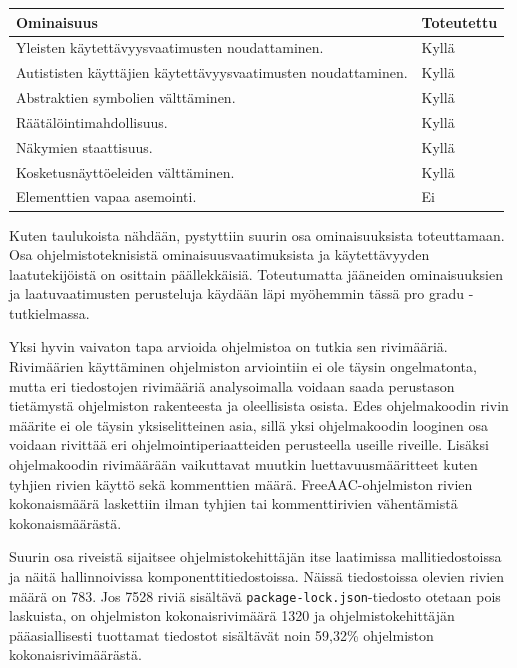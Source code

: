 \documentclass[utf8]{gradu3}
\begin{document}
\begin{center}
    \begin{tabular}{ | l | l |}
    \hline
    \textbf{Ominaisuus} & \textbf{Toteutettu} \\ \hline
    Yleisten käytettävyysvaatimusten noudattaminen. & Kyllä \\ \hline
    Autististen käyttäjien käytettävyysvaatimusten noudattaminen. & Kyllä \\ \hline
    Abstraktien symbolien välttäminen. & Kyllä \\ \hline
    Räätälöintimahdollisuus. & Kyllä \\ \hline
    Näkymien staattisuus. & Kyllä \\ \hline
    Kosketusnäyttöeleiden välttäminen. & Kyllä \\ \hline
    Elementtien vapaa asemointi. & Ei \\ \hline
    \end{tabular}
\end{center}

Kuten taulukoista nähdään, pystyttiin suurin osa ominaisuuksista toteuttamaan. Osa ohjelmistoteknisistä ominaisuusvaatimuksista ja käytettävyyden laatutekijöistä on osittain päällekkäisiä. Toteutumatta jääneiden ominaisuuksien ja laatuvaatimusten perusteluja käydään läpi myöhemmin tässä pro gradu -tutkielmassa.

Yksi hyvin vaivaton tapa arvioida ohjelmistoa on tutkia sen rivimääriä. Rivimäärien käyttäminen ohjelmiston arviointiin ei ole täysin ongelmatonta, mutta eri tiedostojen rivimääriä analysoimalla voidaan saada perustason tietämystä ohjelmiston rakenteesta ja oleellisista osista. Edes ohjelmakoodin rivin määrite ei ole täysin yksiselitteinen asia, sillä yksi ohjelmakoodin looginen osa voidaan rivittää eri ohjelmointiperiaatteiden perusteella useille riveille. Lisäksi ohjelmakoodin rivimäärään vaikuttavat muutkin luettavuusmääritteet kuten tyhjien rivien käyttö sekä kommenttien määrä. FreeAAC-ohjelmiston rivien kokonaismäärä laskettiin ilman tyhjien tai kommenttirivien vähentämistä kokonaismäärästä.

Suurin osa riveistä sijaitsee ohjelmistokehittäjän itse laatimissa mallitiedostoissa ja näitä hallinnoivissa komponenttitiedostoissa. Näissä tiedostoissa olevien rivien määrä on 783. Jos 7528 riviä sisältävä \texttt{package-lock.json}-tiedosto otetaan pois laskuista, on ohjelmiston kokonaisrivimäärä 1320 ja ohjelmistokehittäjän pääasiallisesti tuottamat tiedostot sisältävät noin 59,32\% ohjelmiston kokonaisrivimäärästä.
\end{document}
